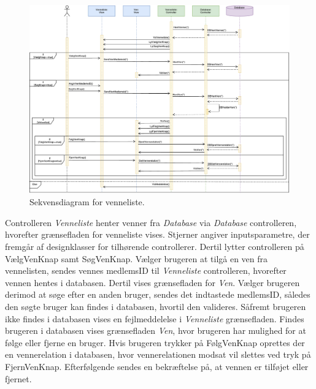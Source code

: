 \begin{figure} [H]
\centering
\includegraphics[width=1.55\textwidth, angle=90]{figures/Sek/SEKVenneliste}
\caption{Sekvensdiagram for venneliste.}
\label{fig:SEKVenneliste}
\end{figure}

\noindent
Controlleren \textit{Venneliste} henter venner fra \textit{Database} via \textit{Database} controlleren, hvorefter grænsefladen for venneliste vises. Stjerner angiver inputsparametre, der fremgår af designklasser for tilhørende controllerer. 
Dertil lytter controlleren på VælgVenKnap samt SøgVenKnap. Vælger brugeren at tilgå en ven fra vennelisten, sendes vennes medlemsID til \textit{Venneliste} controlleren, hvorefter vennen hentes i databasen. Dertil vises grænsefladen for \textit{Ven}. Vælger brugeren derimod at søge efter en anden bruger, sendes det indtastede medlemsID, således den søgte bruger kan findes i databasen, hvortil den valideres. Såfremt brugeren ikke findes i databasen vises en fejlmeddelelse i \textit{Venneliste} grænsefladen. Findes brugeren i databasen vises grænsefladen \textit{Ven}, hvor brugeren har mulighed for at følge eller fjerne en bruger. Hvis brugeren trykker på FølgVenKnap oprettes der en vennerelation i databasen, hvor vennerelationen modsat vil slettes ved tryk på FjernVenKnap. Efterfølgende sendes en bekræftelse på, at vennen er tilføjet eller fjernet. 




